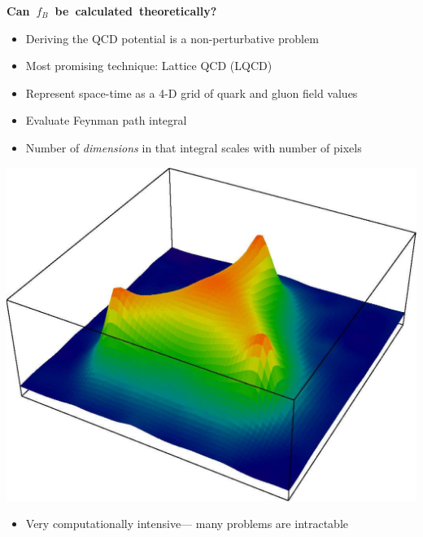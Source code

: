 \documentclass[landscape]{article}
\newenvironment{slide}[1][ ]{\mbox{\bf \boldmath #1 } \vfill}{\vfill \vspace{-1.5 cm} \mbox{ } \pagebreak}
\newenvironment{itemizer}[1]{\begin{itemize}\setlength{\itemsep}{#1}}{\end{itemize}}
\begin{document}
\begin{slide}[Can $f_B$ be calculated theoretically?]

\begin{itemizer}{1 cm}

  \item Deriving the QCD potential is a non-perturbative problem

  \item Most promising technique: Lattice QCD (LQCD)

\end{itemizer}

\vspace{1 cm}
\begin{minipage}{0.5\linewidth}
  \begin{itemizer}{1 cm}
    \item Represent space-time as a 4-D grid of quark and gluon field values

    \item Evaluate Feynman path integral

    \item Number of {\it dimensions} in that \mbox{integral} scales
    with number of \mbox{pixels}

  \end{itemizer}
\end{minipage} \hfill \begin{minipage}{0.45\linewidth}
  \includegraphics[width=\linewidth]{../qcd_proton}
\end{minipage}

\vspace{1 cm}
\begin{itemizer}{1 cm}

  \item Very computationally intensive--- many problems are intractable

\end{itemizer}

\end{slide}
\end{document}
